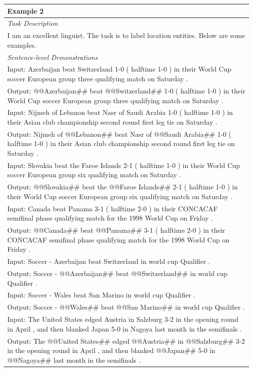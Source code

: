 \documentclass{article}
\begin{document}
\begin{table}[th!]
{\begin{tabular}{l}
\textbf{Example 2} \\\midrule
       	\textit{Task Description} \\
I am an excellent linguist. The task is to label location entities. Below are some examples. \\\midrule
\textit{Sentence-level Demonstrations} \\
Input: Azerbaijan beat Switzerland 1-0 ( halftime 1-0 ) in their World Cup soccer European group three qualifying match on Saturday . \\
Output: @@Azerbaijan\#\# beat @@Switzerland\#\# 1-0 ( halftime 1-0 ) in their World Cup soccer European group three qualifying match on Saturday . \\
Input: Nijmeh of Lebanon beat Nasr of Saudi Arabia 1-0 ( halftime 1-0 ) in their Asian club championship second round first leg tie on Saturday . \\
Output: Nijmeh of @@Lebanon\#\# beat Nasr of @@Saudi Arabia\#\# 1-0 ( halftime 1-0 ) in their Asian club championship second round first leg tie on Saturday . \\
Input: Slovakia beat the Faroe Islands 2-1 ( halftime 1-0 ) in their World Cup soccer European group six qualifying match on Saturday . \\
Output: @@Slovakia\#\# beat the @@Faroe Islands\#\# 2-1 ( halftime 1-0 ) in their World Cup soccer European group six qualifying match on Saturday . \\
Input: Canada beat Panama 3-1 ( halftime 2-0 ) in their CONCACAF semifinal phase qualifying match for the 1998 World Cup on Friday . \\
Output: @@Canada\#\# beat @@Panama\#\# 3-1 ( halftime 2-0 ) in their CONCACAF semifinal phase qualifying match for the 1998 World Cup on Friday . \\
Input: Soccer - Azerbaijan beat Switzerland in world cup Qualifier . \\
Output: Soccer - @@Azerbaijan\#\# beat @@Switzerland\#\# in world cup Qualifier . \\
Input: Soccer - Wales beat San Marino in world cup Qualifier . \\
Output: Soccer - @@Wales\#\# beat @@San Marino\#\# in world cup Qualifier . \\
Input: The United States edged Austria in Salzburg 3-2 in the opening round in April , and then blanked Japan 5-0 in Nagoya last month in the semifinals . \\
Output: The @@United States\#\# edged @@Austria\#\# in @@Salzburg\#\# 3-2 in the opening round in April , and then blanked @@Japan\#\# 5-0 in @@Nagoya\#\# last month in the semifinals . \\

\end{tabular}}
\end{table}
\end{document}
